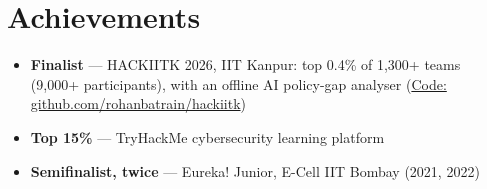 \documentclass[10pt,a4paper]{article}
\begin{document}
\section{Achievements}
\begin{itemize}
  \item \textbf{Finalist} --- HACKIITK 2026, IIT Kanpur: top 0.4\% of 1,300+ teams (9,000+ participants), with an offline AI policy-gap analyser (\href{https://github.com/rohanbatrain/hackiitk}{Code: github.com/rohanbatrain/hackiitk})
  \item \textbf{Top 15\%} --- TryHackMe cybersecurity learning platform
  \item \textbf{Semifinalist, twice} --- Eureka! Junior, E-Cell IIT Bombay (2021, 2022)
\end{itemize}
\end{document}
